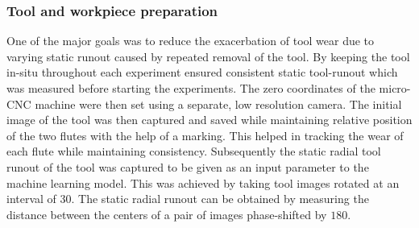 \documentclass[preprint,review,12pt]{elsarticle}
\begin{document}
\subsubsection{Tool and workpiece preparation}
One of the major goals was to reduce the exacerbation of tool wear due to varying static runout caused by repeated removal of the tool. By keeping the tool in-situ throughout each experiment ensured consistent static tool-runout which was measured before starting the experiments. The zero coordinates of the micro-CNC machine were then set using a separate, low resolution camera. The initial image of the tool was then captured and saved while maintaining relative position of the two flutes with the help of a marking. This helped in tracking the wear of each flute while maintaining consistency. Subsequently the static radial tool runout of the tool was captured to be given as an input parameter to the machine learning model. This was achieved by taking tool images rotated at an interval of $30$\textdegree. The static radial runout can be obtained by measuring the distance between the centers of a pair of images phase-shifted by $180$\textdegree. \par

\end{document}
